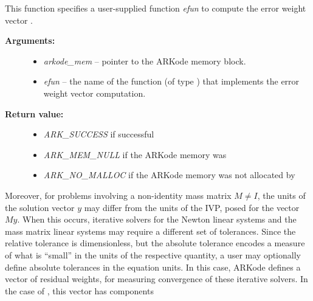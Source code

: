 \documentclass[letterpaper,10pt,english]{sphinxmanual}
\begin{document}
\begin{fulllineitems}
\label{c_interface/User_callable:ARKodeWFtolerances}
This function specifies a user-supplied function \emph{efun} to compute
the error weight vector .
\begin{description}
\item[{\textbf{Arguments:}}] \leavevmode\begin{itemize}
\item {} 
\emph{arkode\_mem} -- pointer to the ARKode memory block.

\item {} 
\emph{efun} -- the name of the function (of type {\hyperref[c_interface/User_supplied:ARKEwtFn]{}})
that implements the error weight vector computation.

\end{itemize}

\item[{\textbf{Return value:}}] \leavevmode\begin{itemize}
\item {} 
\emph{ARK\_SUCCESS} if successful

\item {} 
\emph{ARK\_MEM\_NULL}  if the ARKode memory was 

\item {} 
\emph{ARK\_NO\_MALLOC}  if the ARKode memory was not allocated by {\hyperref[c_interface/User_callable:ARKodeInit]{}}

\end{itemize}

\end{description}

\end{fulllineitems}


Moreover, for problems involving a non-identity mass matrix
$M\ne I$, the units of the solution vector $y$ may differ
from the units of the IVP, posed for the vector $My$.  When this
occurs, iterative solvers for the Newton linear systems and the mass
matrix linear systems may require a different set of tolerances.
Since the relative tolerance is dimensionless, but the absolute
tolerance encodes a measure of what is ``small'' in the units of the
respective quantity, a user may optionally define absolute tolerances
in the equation units.  In this case, ARKode defines a vector of residual
weights,  for measuring convergence of these iterative solvers.
In the case of {\hyperref[c_interface/User_callable:ARKodeResStolerance]{}}, this vector has components
\end{document}
